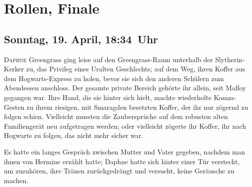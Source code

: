 \chapter{Rollen, Finale}

\section{Sonntag, 19. April, 18:34~Uhr}

\lettrine{D}{aphne} Greengrass ging leise auf den Greengrass-Raum unterhalb der Slytherin-Kerker zu, das Privileg eines Uralten Geschlechts; auf dem Weg, ihren Koffer aus dem Hogwarts-Express zu holen, bevor sie sich den anderen Schülern zum Abendessen anschloss. Der gesamte private Bereich gehörte ihr allein, seit Malfoy gegangen war. Ihre Hand, die sie hinter sich hielt, machte wiederholte Komm-Gesten zu ihrem riesigen, mit Smaragden besetzten Koffer, der ihr nur zögernd zu folgen schien. Vielleicht mussten die Zaubersprüche auf dem robusten alten Familiengerät neu aufgetragen werden; oder vielleicht zögerte ihr Koffer, ihr nach Hogwarts zu folgen, das nicht mehr sicher war.

Es hatte ein langes Gespräch zwischen Mutter und Vater gegeben, nachdem man ihnen von Hermine erzählt hatte; Daphne hatte sich hinter einer Tür versteckt, um zuzuhören, ihre Tränen zurückgedrängt und versucht, keine Geräusche zu machen.

